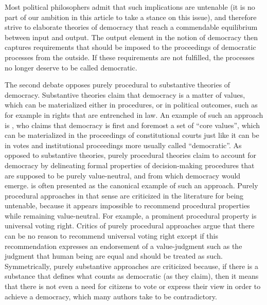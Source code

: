 \documentclass[preprint, french, english, 11pt]{elsarticle}%
\begin{document}
Most political philosophers admit that such implications are untenable (it is no part of our ambition in this article to take a stance on this issue), and therefore strive to elaborate theories of democracy that reach a commendable equilibrium between input and output. The output element in the notion of democracy then captures requirements that should be imposed to the proceedings of democratic processes from the outside. If these requirements are not fulfilled, the processes no longer deserve to be called democratic. %

The second debate opposes purely procedural to substantive theories of democracy. Substantive theories claim that democracy is a matter of values, which can be materialized either in procedures, or in political outcomes, such as for example in rights that are entrenched in law. An example of such an approach is \cite{brettschneider_value_2006}, who claims that democracy is first and foremost a set of ``core values'', which can be materialized in the proceedings of constitutional courts just like it can be in votes and institutional proceedings more usually called ``democratic''. As opposed to substantive theories, purely procedural theories claim to account for democracy by delineating formal properties of decision-making procedures that are supposed to be purely value-neutral, and from which democracy would emerge. \cite{habermas_faktizitat_1992} is often presented as the canonical example of such an approach. Purely procedural approaches in that sense are criticized in the literature for being untenable, because it appears impossible to recommend procedural properties while remaining value-neutral. For example, a prominent procedural property is universal voting right. Critics of purely procedural approaches argue that there can be no reason to recommend universal voting right except if this recommendation expresses an endorsement of a value-judgment such as the judgment that human being are equal and should be treated as such. Symmetrically, purely substantive approaches are criticized because, if there is a substance that defines what counts as democratic (as they claim), then it means that there is not even a need for citizens to vote or express their view in order to achieve a democracy, which many authors take to be contradictory.
\end{document}
